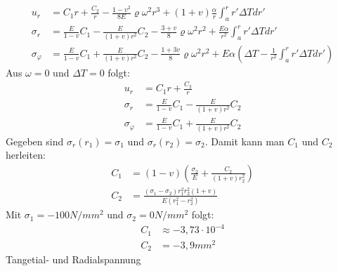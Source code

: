 \documentclass[]{article}
\begin{document}
\begin{center}
\end{center}
\begin{align*}
u_r&=C_1r+\frac{C_2}{r}-\frac{1-v^2}{8E}\varrho\omega^2r^3+(1+v)\frac{\alpha}{r}\int_{a}^{r}r'\Delta Tdr'\\
\sigma_r&=\frac{E}{1-v}C_1-\frac{E}{(1+v)r^2}C_2-\frac{3+v}{8}\varrho\omega^2r^2+\frac{E\alpha}{r^2}\int_{a}^{r}r'\Delta Tdr'\\
\sigma_\varphi&=\frac{E}{1-v}C_1+\frac{E}{(1+v)r^2}C_2-\frac{1+3v}{8}\varrho\omega^2r^2+E\alpha(\Delta T-\frac{1}{r^2}\int_{a}^{r}r'\Delta Tdr')
\end{align*}
Aus $\omega=0$ und $\Delta T=0$ folgt:
\begin{align*}
u_r&=C_1r+\frac{C_2}{r}\\
\sigma_r&=\frac{E}{1-v}C_1-\frac{E}{(1+v)r^2}C_2\\
\sigma_\varphi&=\frac{E}{1-v}C_1+\frac{E}{(1+v)r^2}C_2
\end{align*}
Gegeben sind $\sigma_r(r_1)=\sigma_1$ und $\sigma_r(r_2)=\sigma_2$. Damit kann man $C_1$ und $C_2$  herleiten:
\begin{align*}
C_1&=(1-v)\left( \frac{\sigma_2}{E}+\frac{C_2}{(1+v)r_2^2}\right) \\
C_2&=\frac{(\sigma_1-\sigma_2)r_1^2r_2^2(1+v)}{E(r_1^2-r_2^2)}
\end{align*}
Mit $\sigma_1=-100N/mm^2$ und $\sigma_2=0N/mm^2$ folgt:
\begin{align*}
C_1&\approx-3,73\cdot 10^{-4}\\
C_2&=-3,9mm^2
\end{align*}
\def\CA{-0.000373}
\def\CB{-3.9}
\def\E{4000}
\def\sigR{(\CA/0.7-\CB/(1.3*((x*25)+75)*((x*25)+75)))}
\def\sigP{(\CA/0.7+\CB/(1.3*((x*25)+75)*((x*25)+75)))}
\def\sigT{-106.7/200000}
Tangetial- und Radialspannung\\
\vspace{1cm}\\
\end{document}
